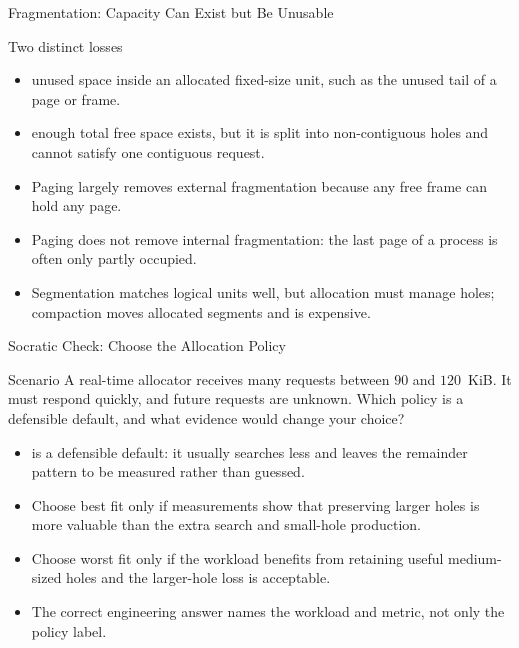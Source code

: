 \documentclass[aspectratio=169]{beamer}
\begin{document}
\begin{frame}{Fragmentation: Capacity Can Exist but Be Unusable}
  \begin{block}{Two distinct losses}
    \begin{itemize}
      \item {} unused space inside an allocated
        fixed-size unit, such as the unused tail of a page or frame.
      \item {} enough total free space exists, but
        it is split into non-contiguous holes and cannot satisfy one contiguous
        request.
    \end{itemize}
  \end{block}
  \begin{itemize}
    \item Paging largely removes external fragmentation because any free frame
      can hold any page.
    \item Paging does not remove internal fragmentation: the last page of a
      process is often only partly occupied.
    \item Segmentation matches logical units well, but allocation must manage
      holes; compaction moves allocated segments and is expensive.
  \end{itemize}
\end{frame}

\begin{frame}{Socratic Check: Choose the Allocation Policy}
  \begin{alertblock}{Scenario}
    A real-time allocator receives many requests between $90$ and $120$~KiB.
    It must respond quickly, and future requests are unknown. Which policy is
    a defensible default, and what evidence would change your choice?
  \end{alertblock}
  \begin{itemize}
    \item {} is a defensible default: it usually searches less
      and leaves the remainder pattern to be measured rather than guessed.
    \item Choose best fit only if measurements show that preserving larger holes
      is more valuable than the extra search and small-hole production.
    \item Choose worst fit only if the workload benefits from retaining useful
      medium-sized holes and the larger-hole loss is acceptable.
    \item The correct engineering answer names the workload and metric, not
      only the policy label.
  \end{itemize}
\end{frame}
\end{document}

